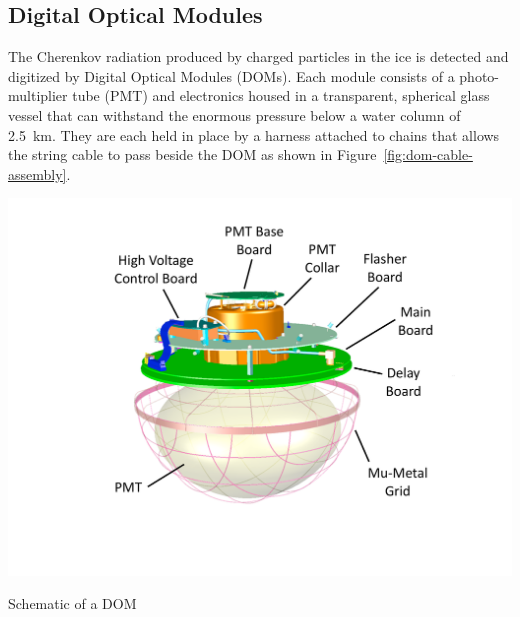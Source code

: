 \subsection{Digital Optical Modules}
\label{sec:dom-daq}
The Cherenkov radiation produced by charged particles in the ice is detected and digitized by Digital Optical Modules (DOMs). Each module consists of a photo-multiplier tube (PMT) and electronics housed in a transparent, spherical glass vessel that can withstand the enormous pressure below a water column of 2.5~km. They are each held in place by a harness attached to chains that allows the string cable to pass beside the DOM as shown in Figure~\ref{fig:dom-cable-assembly}.
\begin{marginfigure}
    \includegraphics[width=\textwidth]{figures/icecube/domfig1a-DOM3DModel.pdf}
    \caption{Schematic of a DOM}
    \label{fig:dom-schematic}
\end{marginfigure}

